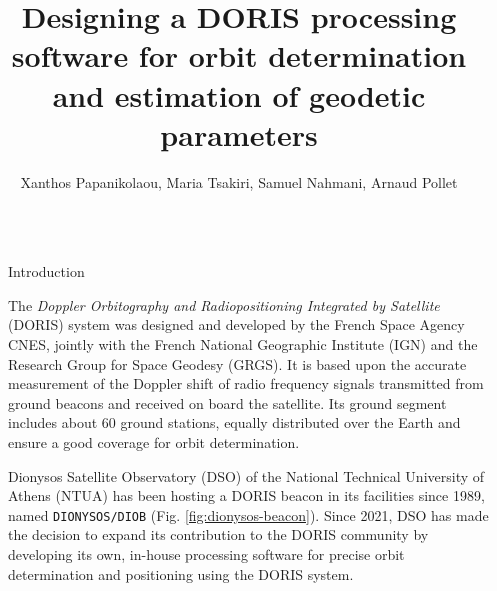 \documentclass[final,a0,portrait]{beamer}
\title{Designing a DORIS processing software for orbit determination and estimation of geodetic parameters} %
\author{Xanthos Papanikolaou, Maria Tsakiri, Samuel Nahmani, Arnaud Pollet}%
\institute{Dionysos Satellite Observatory, School of Rural, Surveying \& Geoinformatics Engineering \\ \par{National Technical University of Athens}} %
\newlength{\sepwid}
\newlength{\onecolwid}
\begin{document}

\setlength{\belowcaptionskip}{2ex} %
\setlength\belowdisplayshortskip{2ex} %

\begin{frame}[t] %

\begin{columns}[t] %

\begin{column}{\sepwid}\end{column} %

\begin{column}{\onecolwid} %


\begin{block}{Introduction}
{\small
The \emph{Doppler Orbitography and Radiopositioning Integrated by Satellite} 
(DORIS) system was designed and developed by the French Space Agency CNES, jointly with 
the French National Geographic Institute (IGN) and the Research Group for Space 
Geodesy (GRGS). It is  based upon the accurate measurement of the Doppler shift 
of radio frequency signals transmitted from ground beacons and received on board 
the satellite. Its ground segment includes about 60 ground stations, equally 
distributed over the Earth and ensure a good coverage for orbit determination.\hfill \break

Dionysos Satellite Observatory (DSO) of the National Technical University of 
Athens (NTUA) has been hosting a DORIS beacon in its facilities since 1989, 
named \texttt{DIONYSOS/DIOB} (Fig. \ref{fig:dionysos-beacon}). Since 2021, DSO 
has made the decision to expand its contribution to the DORIS community by 
developing its own, in-house processing software for precise orbit determination 
and positioning using the DORIS system. \hfill \break
}


\end{block}
\end{column}
\end{columns}
\end{frame}
\end{document}
